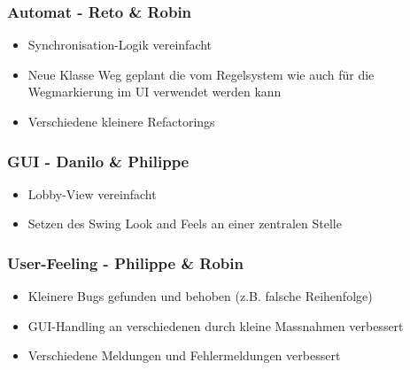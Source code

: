 \documentclass[12pt,halfparskip]{scrartcl}
\begin{document}

\subsubsection{Automat - Reto \& Robin}
\label{ssub:automat_reto_amp_robin}

\begin{itemize}
	\item Synchronisation-Logik vereinfacht
	\item Neue Klasse Weg geplant die vom Regelsystem wie auch für die Wegmarkierung im UI verwendet werden kann
	\item Verschiedene kleinere Refactorings
\end{itemize}


\subsubsection{GUI - Danilo \& Philippe}
\label{ssub:gui_danilo_amp_philippe}

\begin{itemize}
	\item Lobby-View vereinfacht
	\item Setzen des Swing Look and Feels an einer zentralen Stelle
\end{itemize}


\subsubsection{User-Feeling - Philippe \& Robin}
\label{ssub:user_feeling_philippe_amp_robin}

\begin{itemize}
	\item Kleinere Bugs gefunden und behoben (z.B. falsche Reihenfolge)
	\item GUI-Handling an verschiedenen durch kleine Massnahmen verbessert
	\item Verschiedene Meldungen und Fehlermeldungen verbessert
\end{itemize}
\end{document}

